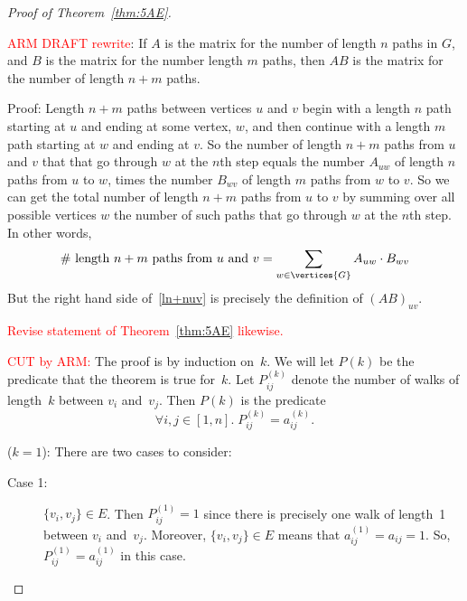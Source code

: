 \begin{proof}[Proof of Theorem~\ref{thm:5AE}]
\begin{editingnotes}
  \textcolor{red}{ARM DRAFT rewrite}:
  If $A$ is the matrix for the number of length $n$ paths in $G$, and $B$
  is the matrix for the number length $m$ paths, then $AB$ is the matrix
  for the number of length $n+m$ paths.

  Proof: Length $n+m$ paths between vertices $u$ and $v$ begin with a
  length $n$ path starting at $u$ and ending at some vertex, $w$, and then
  continue with a length $m$ path starting at $w$ and ending at $v$.  So
  the number of length $n+m$ paths from $u$ and $v$ that that go through
  $w$ at the $n$th step equals the number $A_{uw}$ of length $n$ paths
  from $u$ to $w$, times the number $B_{wv}$ of length $m$ paths from $w$
  to $v$.  So we can get the total number of length $n+m$ paths from $u$
  to $v$ by summing over all possible vertices $w$ the number of such
  paths that go through $w$ at the $n$th step.  In other words,
\begin{equation}\label{ln+nuv}
\text{\# length $n+m$ paths from $u$ and $v$} =
              \sum_{w \in \vertices{G}} A_{uw}\cdot B_{wv}
\end{equation}
But the right hand side of~\eqref{ln+nuv} is precisely the definition of
$(AB)_{uv}$.

\textcolor{red}{Revise statement of Theorem~\ref{thm:5AE} likewise.}
\end{editingnotes}

\begin{editingnotes}
\textcolor{red}{CUT by ARM:}
The proof is by induction on~$k$.  We will let $P(k)$ be the predicate
that the theorem is true for~$k$.  Let $P_{ij}^{(k)}$ denote the
number of walks of length~$k$ between $v_i$ and~$v_j$.  Then $P(k)$ is
the predicate
\begin{equation}\label{eq:5AE}
    \forall i, j \in [1, n].\; P_{ij}^{(k)} = a_{ij}^{(k)}.
\end{equation}

 ($k = 1$):  There are two cases to consider:
\begin{description}

\item[Case 1:]

$\{ v_i, v_j \} \in E$.  Then $P_{ij}^{(1)} = 1$ since there is
  precisely one walk of length~1 between $v_i$ and~$v_j$.  Moreover,
  $\{ v_i, v_j \} \in E$ means that $a_{ij}^{(1)} = a_{ij} = 1$.  So,
  $P_{ij}^{(1)} = a_{ij}^{(1)}$ in this case.


\end{description}
\end{editingnotes}
\end{proof}
